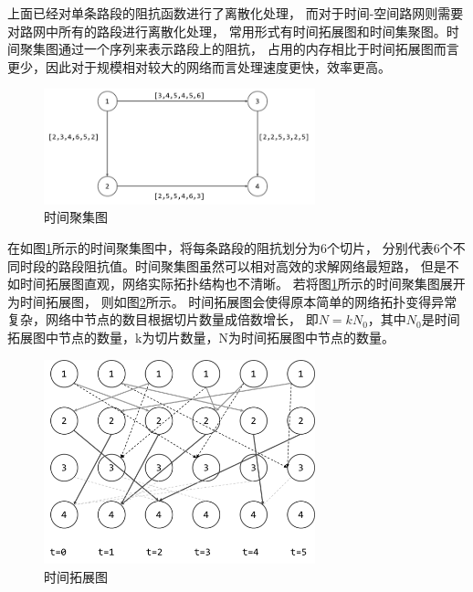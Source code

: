 上面已经对单条路段的阻抗函数进行了离散化处理，
而对于时间-空间路网则需要对路网中所有的路段进行离散化处理，
常用形式有时间拓展图和时间集聚图。时间聚集图通过一个序列来表示路段上的阻抗，
占用的内存相比于时间拓展图而言更少，因此对于规模相对较大的网络而言处理速度更快，效率更高。

\begin{figure}[H] %
    \centering %
    \includegraphics[width=0.7\textwidth]{png/图片6 时间聚集图} %
    \caption{时间聚集图} %
    \label{fig:fig6} %
\end{figure}
在如图\ref{fig:fig6}所示的时间聚集图中，将每条路段的阻抗划分为6个切片，
分别代表6个不同时段的路段阻抗值。时间聚集图虽然可以相对高效的求解网络最短路，
但是不如时间拓展图直观，网络实际拓扑结构也不清晰。
若将图\ref{fig:fig6}所示的时间聚集图展开为时间拓展图， 则如图\ref{fig:fig7}所示。
时间拓展图会使得原本简单的网络拓扑变得异常复杂，网络中节点的数目根据切片数量成倍数增长，
即$N=kN_0$，其中$N_0$是时间拓展图中节点的数量，k为切片数量，N为时间拓展图中节点的数量。

\begin{figure}[H] %
    \centering %
    \includegraphics[width=0.7\textwidth]{png/图片7 时间拓展图} %
    \caption{时间拓展图} %
    \label{fig:fig7} %
\end{figure}


